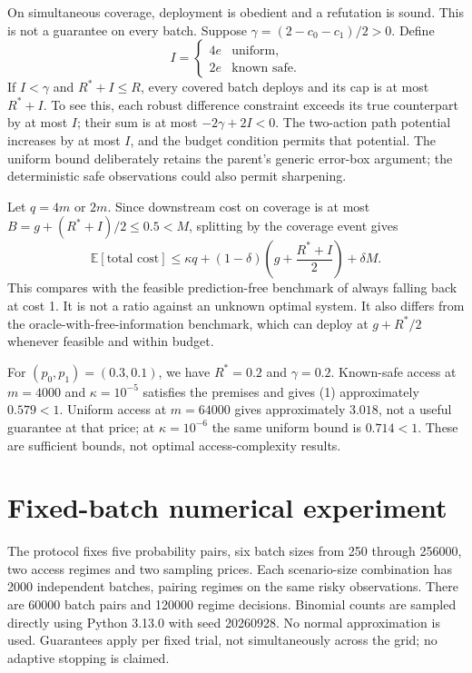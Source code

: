 \documentclass[11pt,a4paper]{article}
\begin{document}
On simultaneous coverage, deployment is obedient and a refutation is sound.
This is not a guarantee on every batch. Suppose
\(\gamma=(2-c_0-c_1)/2>0\). Define
\[
 I=\begin{cases}4e&\text{uniform},\\2e&\text{known safe}.\end{cases}
\]
If \(I<\gamma\) and \(R^*+I\leq R\), every covered batch deploys
and its cap is at most \(R^*+I\). To see this, each robust difference
constraint exceeds its true counterpart by at most \(I\); their sum
is at most \(-2\gamma+2I<0\). The two-action path potential increases
by at most \(I\), and the budget condition permits that potential.
The uniform bound deliberately retains the parent's generic error-box
argument; the deterministic safe observations could also permit sharpening.

Let \(q=4m\) or \(2m\). Since downstream cost on coverage is at most
\(B=g+(R^*+I)/2\leq0.5<M\), splitting by the coverage event gives
\[
 \mathbb E[\text{total cost}]
 \leq \kappa q+(1-\delta)\left(g+\frac{R^*+I}{2}\right)+\delta M.
 \tag{1}
\]
This compares with the feasible prediction-free benchmark of always
falling back at cost 1. It is not a ratio against an unknown optimal system.
It also differs from the oracle-with-free-information benchmark, which
can deploy at \(g+R^*/2\) whenever feasible and within budget.

For \((p_0,p_1)=(0.3,0.1)\), we have \(R^*=0.2\) and
\(\gamma=0.2\). Known-safe access at \(m=4000\) and
\(\kappa=10^{-5}\) satisfies the premises and gives (1) approximately
\(0.579<1\). Uniform access at \(m=64000\) gives approximately
\(3.018\), not a useful guarantee at that price; at \(\kappa=10^{-6}\)
the same uniform bound is \(0.714<1\). These are sufficient bounds,
not optimal access-complexity results.

\section{Fixed-batch numerical experiment}

The protocol fixes five probability pairs, six batch sizes from 250 through
256000, two access regimes and two sampling prices. Each scenario-size
combination has 2000 independent batches, pairing regimes on the same risky
observations. There are 60000 batch pairs and 120000 regime decisions.
Binomial counts are sampled directly using Python 3.13.0 with seed 20260928.
No normal approximation is used. Guarantees apply per fixed trial, not
simultaneously across the grid; no adaptive stopping is claimed.
\end{document}
